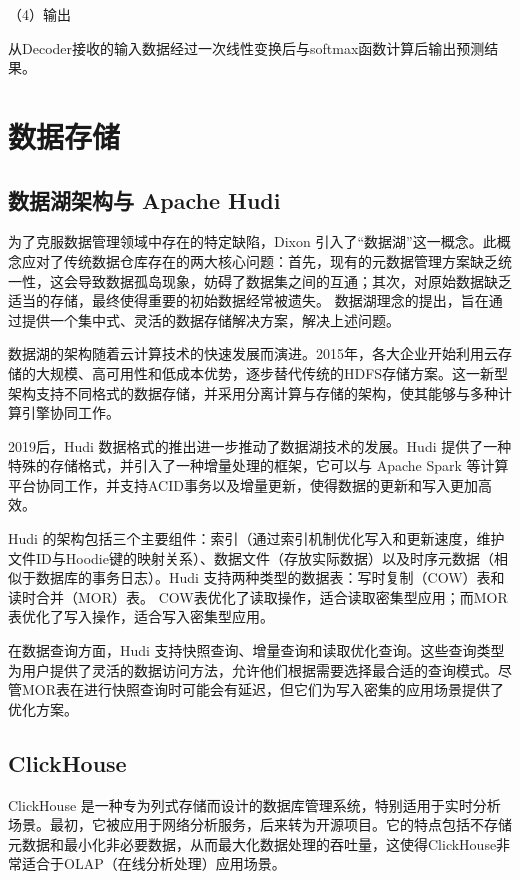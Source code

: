 （4）输出

从Decoder接收的输入数据经过一次线性变换后与softmax函数计算后输出预测结果。

\section{数据存储}
\subsection{数据湖架构与 Apache Hudi}
为了克服数据管理领域中存在的特定缺陷，Dixon 引入了“数据湖”这一概念\cite{sawadogo2021data}。此概念应对了传统数据仓库存在的两大核心问题：首先，现有的元数据管理方案缺乏统一性，这会导致数据孤岛现象，妨碍了数据集之间的互通；其次，对原始数据缺乏适当的存储，最终使得重要的初始数据经常被遗失。
数据湖理念的提出，旨在通过提供一个集中式、灵活的数据存储解决方案，解决上述问题。

数据湖的架构随着云计算技术的快速发展而演进。2015年，各大企业开始利用云存储的大规模、高可用性和低成本优势，逐步替代传统的HDFS存储方案。这一新型架构支持不同格式的数据存储，并采用分离计算与存储的架构，使其能够与多种计算引擎协同工作。

2019后，Hudi 数据格式\cite{Hudi}的推出进一步推动了数据湖技术的发展。Hudi 提供了一种特殊的存储格式，并引入了一种增量处理的框架，它可以与 Apache Spark 等计算平台协同工作，并支持ACID事务以及增量更新\cite{gebretsadkan2019hudi}，使得数据的更新和写入更加高效。

Hudi 的架构包括三个主要组件：索引（通过索引机制优化写入和更新速度，维护文件ID与Hoodie键的映射关系）、数据文件（存放实际数据）以及时序元数据（相似于数据库的事务日志）。Hudi 支持两种类型的数据表：写时复制（COW）表和读时合并（MOR）表\cite{belov2021analysis}。
COW表优化了读取操作，适合读取密集型应用；而MOR表优化了写入操作，适合写入密集型应用。

在数据查询方面，Hudi 支持快照查询、增量查询和读取优化查询。这些查询类型为用户提供了灵活的数据访问方法，允许他们根据需要选择最合适的查询模式。尽管MOR表在进行快照查询时可能会有延迟，但它们为写入密集的应用场景提供了优化方案。
\subsection{ClickHouse}
ClickHouse 是一种专为列式存储而设计的数据库管理系统，特别适用于实时分析场景。最初，它被应用于网络分析服务，后来转为开源项目。它的特点包括不存储元数据和最小化非必要数据，从而最大化数据处理的吞吐量，这使得ClickHouse非常适合于OLAP（在线分析处理）应用场景\cite{goranssonevaluating}。

